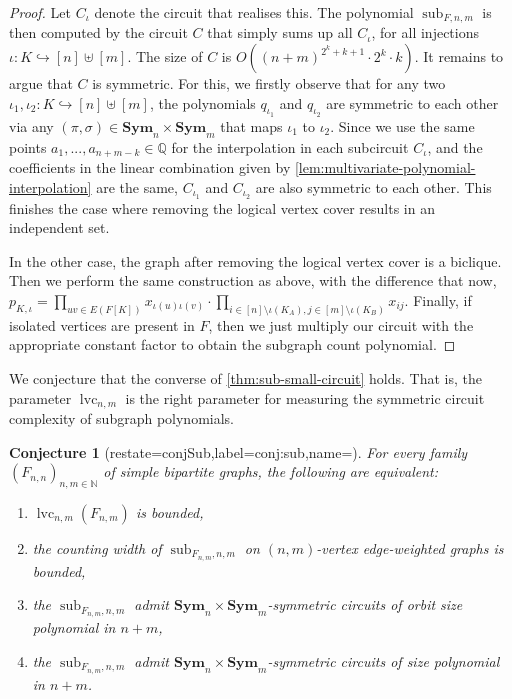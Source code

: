 \documentclass[11pt, DIV=15]{scrarticle}
\theoremstyle{definition}
\theoremstyle{plain}
\newtheorem{conjecture}[definition]{Conjecture}
\theoremstyle{remark}
\DeclareMathOperator{\sub}{sub}
\DeclareMathOperator{\cc}{lvc}
\newcommand{\Sym}{\mathbf{Sym}}
\newcommand{\bbQ}{\mathbb{Q}}
\begin{document}
\begin{proof}
		Let $C_{\iota}$ denote the circuit that realises this. The polynomial $\sub_{F,n,m}$ is then computed by the circuit $C$ that simply sums up all $C_{\iota}$, for all injections $\iota: K \hookrightarrow [n] \uplus [m]$. The size of $C$ is $O((n+m)^{2^k+k+1} \cdot 2^k \cdot k)$. It remains to argue that $C$ is symmetric. 
		For this, we firstly observe that for any two $\iota_1, \iota_2 \colon K \hookrightarrow [n] \uplus [m]$, the polynomials $q_{\iota_1}$ and $q_{\iota_2}$ are symmetric to each other via any $(\pi, \sigma) \in \Sym_n \times \Sym_m$ that maps $\iota_1$ to $\iota_2$. Since we use the same points $a_1,...,a_{n+m-k} \in \bbQ$ for the interpolation in each subcircuit $C_{\iota}$, and the coefficients in the linear combination given by \cref{lem:multivariate-polynomial-interpolation} are the same, $C_{\iota_1}$ and $C_{\iota_2}$ are also symmetric to each other. This finishes the case where removing the logical vertex cover results in an independent set. 
		
		In the other case, the graph after removing the logical vertex cover is a biclique.
		Then we perform the same construction as above, with the difference that now, $p_{K,\iota} = \prod_{uv \in E(F[K])} x_{\iota(u)\iota(v)} \cdot \prod_{i \in [n] \setminus \iota(K_A), j\in [m] \setminus \iota(K_B)} x_{ij}$.
		Finally, if isolated vertices are present in $F$, then we just multiply our circuit with the appropriate constant factor to obtain the subgraph count polynomial.
	\end{proof}	
	
	We conjecture that the converse of \cref{thm:sub-small-circuit} holds.
	That is, the parameter $\cc_{n,m}$ is the right parameter for measuring the symmetric circuit complexity of subgraph polynomials.
	\begin{conjecture}[restate=conjSub,label=conj:sub,name=]
		For every family $(F_{n,n})_{n,m \in \mathbb{N}}$ of simple bipartite graphs,
		the following are equivalent:
		\begin{enumerate}
			\item $\cc_{n,m}(F_{n,m})$ is bounded,\label{it:subconj1}
			\item the counting width of $\sub_{F_{n,m},n,m}$ on $(n,m)$-vertex edge-weighted graphs is bounded,\label{it:subconj2}
			\item the $\sub_{F_{n,m}, n, m}$ admit $\Sym_n \times \Sym_m$-symmetric circuits of orbit size polynomial in $n+m$,\label{it:subconj3}
			\item the $\sub_{F_{n,m}, n, m}$ admit $\Sym_n \times \Sym_m$-symmetric circuits of size polynomial in $n+m$.\label{it:subconj4}
		\end{enumerate}
	\end{conjecture}
	
\end{document}
